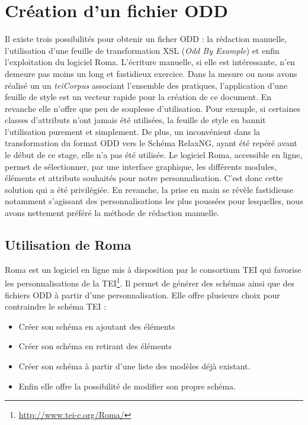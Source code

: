 \documentclass[12pt,a4paper]{book} %
\begin{document}
\section{Création d'un fichier ODD}
Il existe trois possibilités pour obtenir un ficher ODD : la rédaction manuelle, l'utilisation d'une feuille de transformation XSL (\textit{Odd By Example}) et enfin l'exploitation du logiciel Roma.
L'écriture manuelle, si elle est intéressante, n'en demeure pas moins un long et fastidieux exercice. Dans la mesure ou nous avons réalisé un un \textit{teiCorpus} associant l'ensemble des pratiques, l'application d'une feuille de style est un vecteur rapide pour la création de ce document. En revanche elle n'offre que peu de souplesse d'utilisation. Pour exemple, si certaines classes d'attributs n'ont jamais été utilisées, la feuille de style en bannit l'utilisation purement et simplement. De plus, un inconvénient dans la transformation du format ODD vers le Schéma RelaxNG, ayant été repéré avant le début de ce stage, elle n'a pas été utilisée. Le logiciel Roma, accessible en ligne, permet  de sélectionner, par une interface graphique, les différents modules, éléments et attributs souhaités pour notre personnalisation. C'est donc cette solution qui a été privilégiée. En revanche, la prise en main se révèle fastidieuse notamment s'agissant des personnalisations les plus poussées pour lesquelles, nous avons nettement préféré la méthode de rédaction manuelle.

\subsection{Utilisation de Roma}

Roma est un logiciel en ligne mis à disposition par le consortium TEI qui favorise les personnalisations de la TEI\footnote{\url{http://www.tei-c.org/Roma/}}. Il permet de générer des schémas ainsi que des fichiers ODD à partir d'une personnalisation. 
Elle offre plusieurs choix pour contraindre le schéma TEI :
\medskip
\begin{itemize}
\item Créer son schéma en ajoutant des éléments
\item Créer son schéma en retirant des éléments
\item Créer son schéma à partir d'une liste des modèles déjà existant.
\item Enfin elle offre la possibilité de modifier son propre schéma.
\end{itemize}
\medskip
\end{document}
